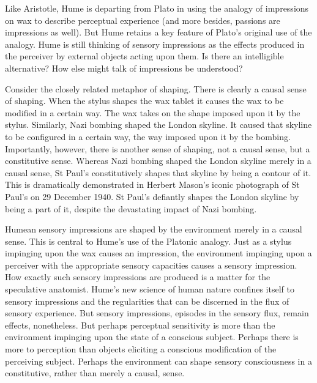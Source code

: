 Like Aristotle, Hume is departing from Plato in using the analogy of impressions on wax to describe perceptual experience (and more besides, passions are impressions as well). But Hume retains a key feature of Plato's original use of the analogy. Hume is still thinking of sensory impressions as the effects produced in the perceiver by external objects acting upon them. Is there an intelligible alternative? How else might talk of impressions be understood? 

Consider the closely related metaphor of shaping. There is clearly a causal sense of shaping. When the stylus shapes the wax tablet it causes the wax to be modified in a certain way. The wax takes on the shape imposed upon it by the stylus. Similarly, Nazi bombing shaped the London skyline. It caused that skyline to be configured in a certain way, the way imposed upon it by the bombing. Importantly, however, there is another sense of shaping, not a causal sense, but a constitutive sense. Whereas Nazi bombing shaped the London skyline merely in a causal sense, St Paul's constitutively shapes that skyline by being a contour of it. This is dramatically demonstrated in Herbert Mason's iconic photograph of St Paul's on 29 December 1940. St Paul's defiantly shapes the London skyline by being a part of it, despite the devastating impact of Nazi bombing.


Humean sensory impressions are shaped by the environment merely in a causal sense. This is central to Hume's use of the Platonic analogy. Just as a stylus impinging upon the wax causes an impression, the environment impinging upon a perceiver with the appropriate sensory capacities causes a sensory impression. How exactly such sensory impressions are produced is a matter for the speculative a\-na\-to\-mist. Hume's new science of human nature confines itself to sensory impressions and the regularities that can be discerned in the flux of sensory experience. But sensory impressions, episodes in the sensory flux, remain effects, nonetheless. But perhaps perceptual sensitivity is more than the environment impinging upon the state of a conscious subject. Perhaps there is more to perception than objects eliciting a conscious modification of the perceiving subject. Perhaps the environment can shape sensory consciousness in a constitutive, rather than merely a causal, sense.

